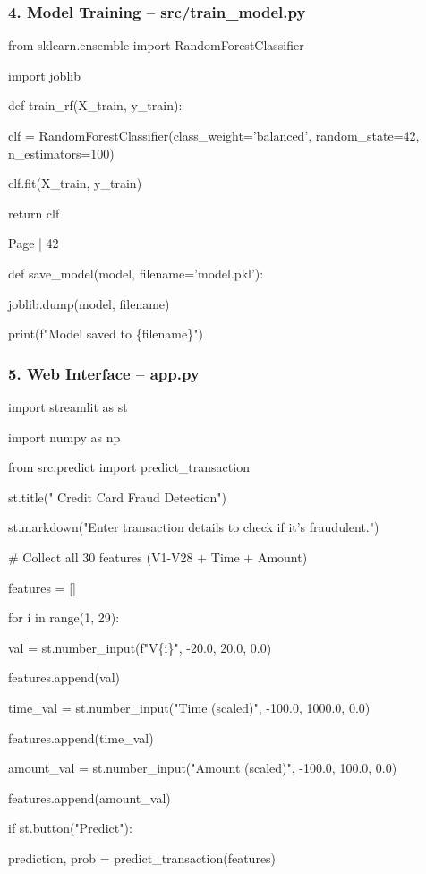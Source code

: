 \documentclass[11pt,a4paper]{article}
\begin{document}
\subsubsection*{4. Model Training – src/train\_model.py }

from sklearn.ensemble import RandomForestClassifier 

import joblib 

def train\_rf(X\_train, y\_train): 

    clf = RandomForestClassifier(class\_weight='balanced', random\_state=42, n\_estimators=100) 

    clf.fit(X\_train, y\_train) 

    return clf 

Page | 42  

\newpage

def save\_model(model, filename='model.pkl'): 

    joblib.dump(model, filename) 

    print(f"Model saved to \{filename\}") 

\subsubsection*{5. Web Interface – app.py }

import streamlit as st 

import numpy as np 

from src.predict import predict\_transaction 

st.title("  Credit Card Fraud Detection") 

st.markdown("Enter transaction details to check if it's fraudulent.") 

\# Collect all 30 features (V1-V28 + Time + Amount) 

features = [] 

for i in range(1, 29): 

    val = st.number\_input(f"V\{i\}", -20.0, 20.0, 0.0) 

    features.append(val) 

time\_val = st.number\_input("Time (scaled)", -100.0, 1000.0, 0.0) 

features.append(time\_val) 

amount\_val = st.number\_input("Amount (scaled)", -100.0, 100.0, 0.0) 

features.append(amount\_val) 

if st.button("Predict"): 

    prediction, prob = predict\_transaction(features) 
\end{document}
